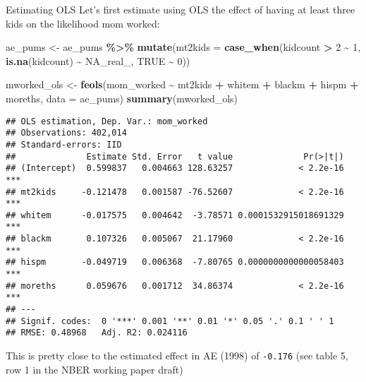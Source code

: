 \documentclass[
  ignorenonframetext,
]{beamer}
\newenvironment{Shaded}{\begin{snugshade}}{\end{snugshade}}
\newcommand{\AttributeTok}[1]{\textcolor[rgb]{0.13,0.29,0.53}{#1}}
\newcommand{\ConstantTok}[1]{\textcolor[rgb]{0.56,0.35,0.01}{#1}}
\newcommand{\DecValTok}[1]{\textcolor[rgb]{0.00,0.00,0.81}{#1}}
\newcommand{\FunctionTok}[1]{\textcolor[rgb]{0.13,0.29,0.53}{\textbf{#1}}}
\newcommand{\NormalTok}[1]{#1}
\newcommand{\OtherTok}[1]{\textcolor[rgb]{0.56,0.35,0.01}{#1}}
\newcommand{\SpecialCharTok}[1]{\textcolor[rgb]{0.81,0.36,0.00}{\textbf{#1}}}
\begin{document}
\begin{frame}[fragile]{Estimating OLS}
\label{estimating-ols}
Let's first estimate using OLS the effect of having at least three kids
on the likelihood mom worked:

\tiny

\begin{Shaded}
\begin{Highlighting}[]
\NormalTok{ae\_pums }\OtherTok{\textless{}{-}}\NormalTok{ ae\_pums }\SpecialCharTok{\%\textgreater{}\%}
  \FunctionTok{mutate}\NormalTok{(}\AttributeTok{mt2kids =} \FunctionTok{case\_when}\NormalTok{(kidcount }\SpecialCharTok{\textgreater{}} \DecValTok{2} \SpecialCharTok{\textasciitilde{}} \DecValTok{1}\NormalTok{,}
                             \FunctionTok{is.na}\NormalTok{(kidcount) }\SpecialCharTok{\textasciitilde{}} \ConstantTok{NA\_real\_}\NormalTok{,}
                             \ConstantTok{TRUE} \SpecialCharTok{\textasciitilde{}} \DecValTok{0}\NormalTok{))}

\NormalTok{mworked\_ols }\OtherTok{\textless{}{-}} \FunctionTok{feols}\NormalTok{(mom\_worked }\SpecialCharTok{\textasciitilde{}}\NormalTok{ mt2kids }\SpecialCharTok{+}\NormalTok{ whitem }\SpecialCharTok{+}\NormalTok{ blackm }\SpecialCharTok{+}\NormalTok{ hispm }\SpecialCharTok{+}\NormalTok{ moreths, }
                     \AttributeTok{data =}\NormalTok{ ae\_pums)}
\FunctionTok{summary}\NormalTok{(mworked\_ols)}
\end{Highlighting}
\end{Shaded}

\begin{verbatim}
## OLS estimation, Dep. Var.: mom_worked
## Observations: 402,014
## Standard-errors: IID 
##              Estimate Std. Error   t value              Pr(>|t|)    
## (Intercept)  0.599837   0.004663 128.63257             < 2.2e-16 ***
## mt2kids     -0.121478   0.001587 -76.52607             < 2.2e-16 ***
## whitem      -0.017575   0.004642  -3.78571 0.0001532915018691329 ***
## blackm       0.107326   0.005067  21.17960             < 2.2e-16 ***
## hispm       -0.049719   0.006368  -7.80765 0.0000000000000058403 ***
## moreths      0.059676   0.001712  34.86374             < 2.2e-16 ***
## ---
## Signif. codes:  0 '***' 0.001 '**' 0.01 '*' 0.05 '.' 0.1 ' ' 1
## RMSE: 0.48968   Adj. R2: 0.024116
\end{verbatim}

This is pretty close to the estimated effect in AE (1998) of
\texttt{-0.176} (see table 5, row 1 in the NBER working paper draft)
\end{frame}
\end{document}

